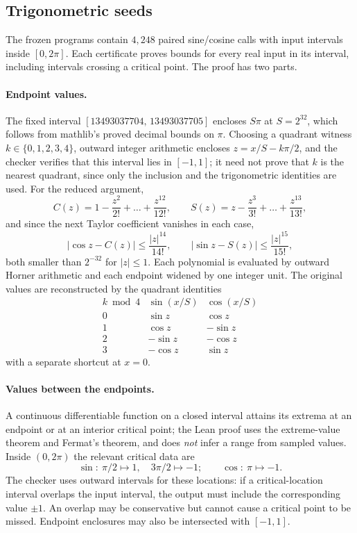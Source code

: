 \documentclass[10pt,a4paper]{article}
\theoremstyle{plain}
\theoremstyle{definition}
\begin{document}
\subsection{Trigonometric seeds}
\label{sec:trig-seeds}

The frozen programs contain $4{,}248$ paired sine/cosine calls with input
intervals inside $[0,2\pi]$. Each certificate proves bounds for every real input
in its interval, including intervals crossing a critical point. The proof has two
parts.

\paragraph{Endpoint values.}
The fixed interval $[13493037704,\,13493037705]$ encloses $S\pi$ at
$S=2^{32}$, which follows from mathlib's proved decimal bounds on $\pi$.
Choosing a quadrant witness $k\in\{0,1,2,3,4\}$, outward integer arithmetic
encloses $z=x/S-k\pi/2$, and the checker verifies that this interval lies in
$[-1,1]$; it need not prove that $k$ is the nearest quadrant, since only the
inclusion and the trigonometric identities are used. For the reduced argument,
\[
  C(z) = 1-\frac{z^2}{2!}+\dots+\frac{z^{12}}{12!},
  \qquad
  S(z) = z-\frac{z^3}{3!}+\dots+\frac{z^{13}}{13!} ,
\]
and since the next Taylor coefficient vanishes in each case,
\[
  |\cos z-C(z)|\le\frac{|z|^{14}}{14!},
  \qquad
  |\sin z-S(z)|\le\frac{|z|^{15}}{15!},
\]
both smaller than $2^{-32}$ for $|z|\le1$. Each polynomial is evaluated by
outward Horner arithmetic and each endpoint widened by one integer unit. The
original values are reconstructed by the quadrant identities
\[
  \begin{array}{c|cc}
    k\bmod4 & \sin(x/S) & \cos(x/S)\\\hline
    0 & \sin z & \cos z\\
    1 & \cos z & -\sin z\\
    2 & -\sin z & -\cos z\\
    3 & -\cos z & \sin z
  \end{array}
\]
with a separate shortcut at $x=0$.

\paragraph{Values between the endpoints.}
A continuous differentiable function on a closed interval attains its extrema at
an endpoint or at an interior critical point; the Lean proof uses the
extreme-value theorem and Fermat's theorem, and does \emph{not} infer a range
from sampled values. Inside $(0,2\pi)$ the relevant critical data are
\[
  \sin:\ \pi/2\mapsto1,\quad 3\pi/2\mapsto-1;
  \qquad
  \cos:\ \pi\mapsto-1 .
\]
The checker uses outward intervals for these locations: if a critical-location
interval overlaps the input interval, the output must include the corresponding
value $\pm1$. An overlap may be conservative but cannot cause a critical point
to be missed. Endpoint enclosures may also be intersected with $[-1,1]$.
\end{document}
